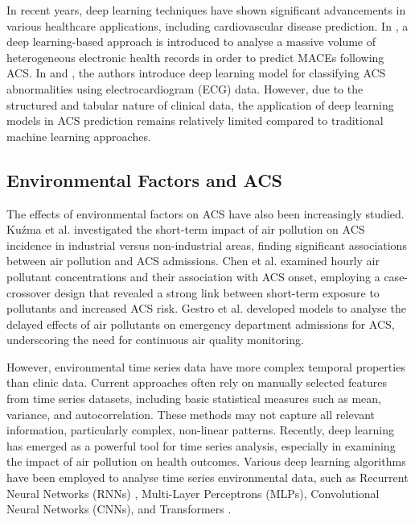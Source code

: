 In recent years, deep learning techniques have shown significant advancements in various healthcare applications, including cardiovascular disease prediction. In \cite{duan2019utilizing}, a deep learning-based approach is introduced to analyse a massive volume of heterogeneous electronic health records in order to predict MACEs following ACS. In \cite{liu2023deep}and \cite{liu2021deep}, the authors introduce deep learning model for classifying ACS abnormalities using electrocardiogram (ECG) data. However, due to the structured and tabular nature of clinical data, the application of deep learning models in ACS prediction remains relatively limited compared to traditional machine learning approaches.




\subsection{Environmental Factors and ACS}


The effects of environmental factors on ACS have also been increasingly studied. Ku\'{z}ma et al. \cite{Kuzma2021Impact} investigated the short-term impact of air pollution on ACS incidence in industrial versus non-industrial areas, finding significant associations between air pollution and ACS admissions. Chen et al. \cite{Chen2022Hourly} examined hourly air pollutant concentrations and their association with ACS onset, employing a case-crossover design that revealed a strong link between short-term exposure to pollutants and increased ACS risk. Gestro et al. \cite{Gestro2020Short} developed models to analyse the delayed effects of air pollutants on emergency department admissions for ACS, underscoring the need for continuous air quality monitoring.

However, environmental time series data have more complex temporal properties than clinic data.  Current approaches often rely on manually selected features from time series datasets, including basic statistical measures such as mean, variance, and autocorrelation. These methods may not capture all relevant information, particularly complex, non-linear patterns. Recently, deep learning has emerged as a powerful tool for time series analysis, especially in examining the impact of air pollution on health outcomes. Various deep learning algorithms have been employed to analyse time series environmental data, such as Recurrent Neural Networks (RNNs) \cite{Husken2003Recurrent,Hewamalage2021Recurrent}, Multi-Layer Perceptrons (MLPs)\cite{Mayer1999Evolutionary}, Convolutional Neural Networks (CNNs)\cite{Zhao2017Convolutional}, and Transformers \cite{Zeng2023Are}.


